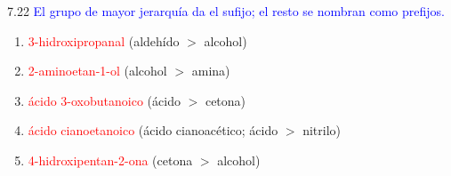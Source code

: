 \begin{Solution}{7.22}
        \textcolor{blue}{El grupo de mayor jerarquía da el sufijo; el resto se nombran como prefijos.}
        \begin{enumerate}[label=\alph*)]
            \item \textcolor{red}{3-hidroxipropanal} (aldehído \(>\) alcohol)
            \item \textcolor{red}{2-aminoetan-1-ol} (alcohol \(>\) amina)
            \item \textcolor{red}{ácido 3-oxobutanoico} (ácido \(>\) cetona)
            \item \textcolor{red}{ácido cianoetanoico} (ácido cianoacético; ácido \(>\) nitrilo)
            \item \textcolor{red}{4-hidroxipentan-2-ona} (cetona \(>\) alcohol)
        \end{enumerate}
    
\end{Solution}

